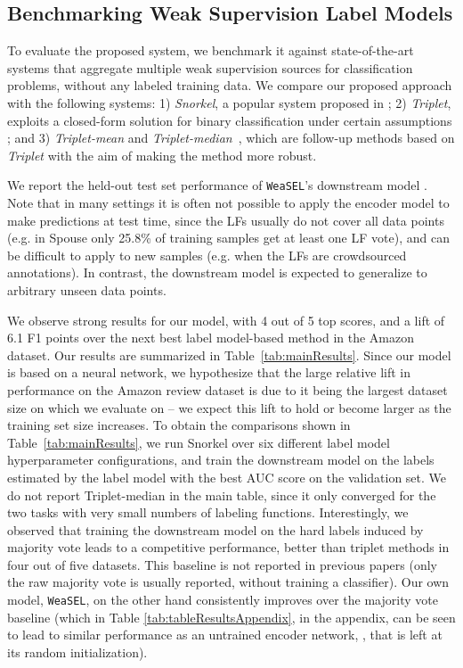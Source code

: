 \documentclass{article}
\newcommand{\weasel}{\texttt{WeaSEL}}\newcommand{\brackets}[1]{\left( #1 \right)}
\begin{document}
\subsection{Benchmarking Weak Supervision Label Models}
To evaluate the proposed system, we benchmark it against state-of-the-art systems that aggregate multiple weak supervision sources for classification problems, without any labeled training data.
We compare our proposed approach with the following systems: 1) \emph{Snorkel}, a popular system proposed in \cite{Snorkel, Multitask}; 2) \emph{Triplet}, exploits a closed-form solution for binary classification under certain assumptions \cite{triplets}; and 3) \emph{Triplet-mean} and \emph{Triplet-median}~\cite{TripletsMean}, which are follow-up methods based on \emph{Triplet} with the aim of making the method more robust.


We report the held-out test set performance of \weasel's downstream model . Note that in many settings it is often not possible to apply the encoder model to make predictions at test time, since the LFs usually do not cover all data points (e.g. in Spouse only 25.8\% of training samples get at least one LF vote), and can be difficult to apply to new samples (e.g. when the LFs are crowdsourced annotations). In contrast, the downstream model is expected to generalize to arbitrary unseen data points.

We observe strong results for our model, with 4 out of 5 top scores, and a lift of 6.1 F1 points over the next best label model-based method in the Amazon dataset. Our results are summarized in Table~\ref{tab:mainResults}.
Since our model is based on a neural network, we hypothesize that the large relative lift in performance on the Amazon review dataset is due to it being the largest dataset size on which we evaluate on -- we expect this lift to hold or become larger as the training set size increases. 
To obtain the comparisons shown in Table~\ref{tab:mainResults}, we run Snorkel over six different label model hyperparameter configurations, and train the downstream model on the labels estimated by the label model with the best AUC score on the validation set.  We do not report Triplet-median in the main table, since it only converged for the two tasks with very small numbers of labeling functions. 
Interestingly, we observed that training the downstream model on the hard labels induced by majority vote leads to a competitive performance, better than triplet methods in four out of five datasets. This baseline is not reported in previous papers (only the raw majority vote is usually reported, without training a classifier). Our own model, \weasel, on the other hand consistently improves over the majority vote baseline (which in Table \ref{tab:tableResultsAppendix}, in the appendix, can be seen to lead to similar performance as an untrained encoder network, , that is left at its random initialization).
\end{document}
